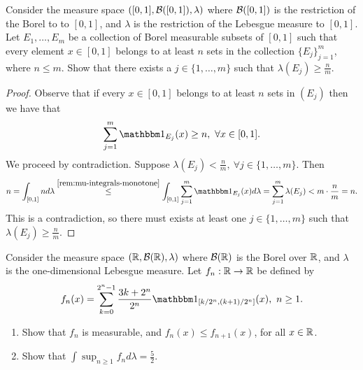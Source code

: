 \begin{ex}
	Consider the measure space $([0,1], \mathcal{B}([0,1]), \lambda)$ where $\mathcal{B}([0,1])$ is the restriction of the Borel \siga to to $[0,1]$, and $\lambda$ is the restriction of the Lebesgue measure to $[0,1]$. Let $E_1, \dots, E_m$ be a collection of Borel measurable subsets of $[0,1]$ such that every element $x \in [0,1]$ belongs to at least $n$ sets in the collection $\{E_j\}_{j=1}^m$, where $n \leq m$. Show that there exists a $j \in \{1, \dots, m\}$ such that $\lambda(E_j) \geq \frac{n}{m}$.
\end{ex}

\begin{proof}
	Observe that if every $x \in [0, 1]$ belongs to at least $n$ sets in $(E_j)$ then we have that
	\begin{align*}
		\sum_{j = 1}^m \ind_{E_j}(x) \geq n,\ \forall x \in [0,1].
	\end{align*}
	We proceed by contradiction. Suppose $\lambda(E_j) < \frac{n}{m},\ \forall j \in \{1, \dots, m\}$. Then
	\begin{align*}
		n = \int_{[0,1]}n d\lambda
		\overset{\ref{rem:mu-integrals-monotone}}{\leq} \int_{[0,1]} \sum_{j=1}^{m}\ind_{E_j}(x)d\lambda
		= \sum_{j = 1}^m \lambda(E_j) < m \cdot \frac{n}{m} = n. 
	\end{align*}
	This is a contradiction, so there must exists at least one $j \in \{1, \dots, m\}$ such that $\lambda(E_j) \geq \frac{n}{m}$.
\end{proof}

\begin{ex}
	Consider the measure space $(\mathbb{R}, \mathcal{B}(\mathbb{R}), \lambda)$ where $\mathcal{B}(\mathbb{R})$ is the Borel \siga over $\mathbb{R}$, and $\lambda$ is the one-dimensional Lebesgue measure. Let $f_n : \mathbb{R} \to \mathbb{R}$ be defined by
	\begin{align*}
		f_n(x) = \sum_{k = 0}^{2^n - 1}\frac{3k + 2^n}{2^n} \ind_{[k/2^n, (k+1)/2^n]}(x),\ n \geq 1.
	\end{align*}
	\begin{enumerate}
		\item Show that $f_n$ is measurable, and $f_n(x) \leq f_{n+1}(x)$, for all $x \in \mathbb{R}$.
		\item Show that $\int \sup_{n \geq 1} f_n d\lambda = \frac{5}{2}$.
	\end{enumerate}
\end{ex}

